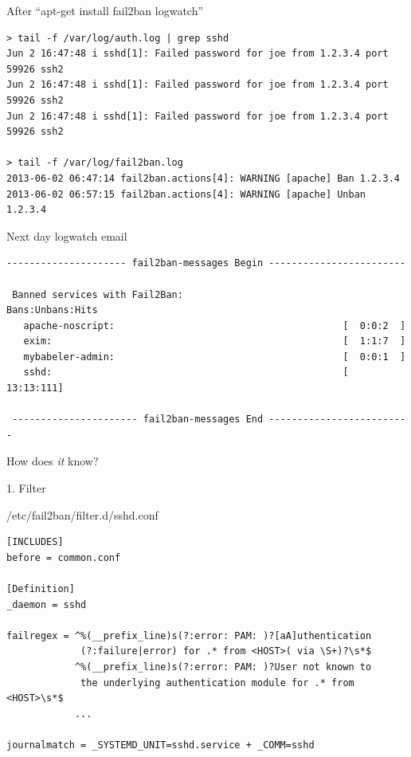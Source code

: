 \documentclass[]{beamer}
\begin{document}
\begin{frame}[fragile]{After ``apt-get install fail2ban logwatch''}

\begin{Verbatim}[commandchars=\\\{\},fontsize=\scriptsize]
> tail -f /var/log/auth.log | grep sshd
Jun 2 16:47:48 i sshd[1]: Failed password for joe from 1.2.3.4 port 59926 ssh2
Jun 2 16:47:48 i sshd[1]: Failed password for joe from 1.2.3.4 port 59926 ssh2
Jun 2 16:47:48 i sshd[1]: Failed password for joe from 1.2.3.4 port 59926 ssh2

> tail -f /var/log/fail2ban.log
2013-06-02 06:47:14 fail2ban.actions[4]: WARNING [apache] Ban 1.2.3.4
2013-06-02 06:57:15 fail2ban.actions[4]: WARNING [apache] Unban 1.2.3.4
\end{Verbatim}

\begin{block}{Next day logwatch email}

\begin{Verbatim}[commandchars=\\\{\},fontsize=\scriptsize]
 --------------------- fail2ban-messages Begin ------------------------

 Banned services with Fail2Ban:                          Bans:Unbans:Hits
   apache-noscript:                                        [  0:0:2  ]
   exim:                                                   [  1:1:7  ]
   mybabeler-admin:                                        [  0:0:1  ]
   sshd:                                                   [ 13:13:111]

 ---------------------- fail2ban-messages End -------------------------
\end{Verbatim}
\end{block}

\end{frame}

\begin{frame}{}
\begin{center}
\Large How does \emph{it} know?
\end{center}
\end{frame}

\begin{frame}[fragile]{1. Filter}

\begin{block}{/etc/fail2ban/filter.d/sshd.conf}
{\scriptsize
\begin{verbatim}
[INCLUDES]
before = common.conf

[Definition]
_daemon = sshd

failregex = ^%(__prefix_line)s(?:error: PAM: )?[aA]uthentication
             (?:failure|error) for .* from <HOST>( via \S+)?\s*$
            ^%(__prefix_line)s(?:error: PAM: )?User not known to
             the underlying authentication module for .* from <HOST>\s*$
            ...

journalmatch = _SYSTEMD_UNIT=sshd.service + _COMM=sshd
\end{verbatim}
}
\end{block}
\end{frame}
\end{document}
